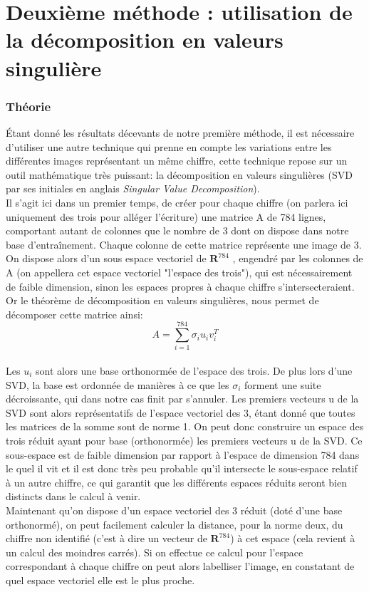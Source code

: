 \documentclass[a4paper,11pt,twoside]{report}
\begin{document}
\chapter{Deuxième méthode : utilisation de la décomposition en valeurs singulière}
\subsection{Théorie}
Étant donné les résultats décevants de notre première méthode, il est nécessaire d'utiliser une autre technique qui prenne en compte les variations entre les différentes images représentant un même chiffre, cette technique repose sur un outil mathématique très puissant: la décomposition en valeurs singulières (SVD par ses initiales en anglais \textit{Singular Value Decomposition}).\\
Il s'agit ici dans un premier temps, de créer pour chaque chiffre (on parlera ici uniquement des trois pour alléger l'écriture) une matrice A de 784 lignes, comportant autant de colonnes que le nombre de 3 dont on dispose dans notre base d’entraînement. Chaque colonne de cette matrice représente une image de 3. On dispose alors d'un sous espace vectoriel de $\textbf{R}^{784}$ , engendré par les colonnes de A (on appellera cet espace vectoriel "l'espace des trois"), qui est nécessairement de faible dimension, sinon les espaces propres à chaque chiffre s'intersecteraient. Or le théorème de décomposition en valeurs singulières, nous permet de décomposer cette matrice ainsi: $$A = \sum_{i=1}^{784}{\sigma_{i}u_{i}v_{i}^{T}}$$\\
Les $u_{i}$ sont alors une base orthonormée de l'espace des trois. De plus lors d'une SVD, la base est ordonnée de manières à ce que les $\sigma_{i}$ forment une suite décroissante, qui dans notre cas finit par s'annuler. Les premiers vecteurs u de la SVD sont alors représentatifs de l'espace vectoriel des 3, étant donné que toutes les matrices de la somme sont de norme 1. On peut donc construire un espace des trois réduit ayant pour base (orthonormée) les premiers vecteurs u de la SVD. Ce sous-espace est de faible dimension par rapport à l'espace de dimension 784 dans le quel il vit et il est donc très peu probable qu'il intersecte le sous-espace relatif à un autre chiffre, ce qui garantit que les différents espaces réduits seront bien distincts dans le calcul à venir.\\
Maintenant qu'on dispose d'un espace vectoriel des 3 réduit (doté d'une base orthonormé), on peut facilement calculer la distance, pour la norme deux, du chiffre non identifié (c'est à dire un vecteur de  $\textbf{R}^{784}$) à cet espace (cela revient à un calcul des moindres carrés). Si on effectue ce calcul pour l'espace correspondant à chaque chiffre on peut alors labelliser l'image, en constatant de quel espace vectoriel elle est le plus proche.
\end{document}

